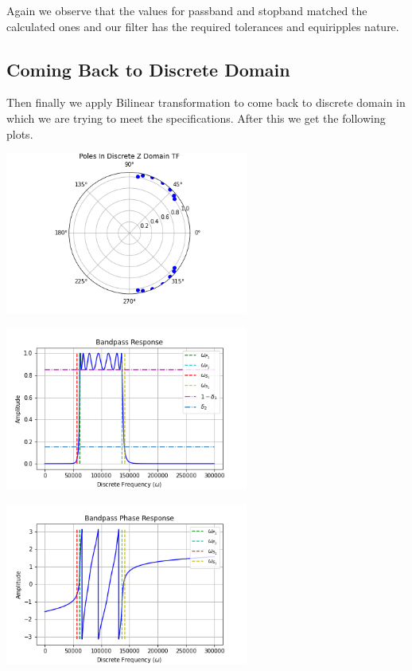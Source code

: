 \documentclass{scrartcl}
\begin{document}
Again we observe that the values for passband and stopband matched the calculated ones and our filter has the required tolerances and equiripples nature.

\subsection{Coming Back to Discrete Domain}

Then finally we apply Bilinear transformation to come back to discrete domain in which we are trying to meet the specifications. After this we get the following plots.


\begin{center}
    \includegraphics[width=0.6\textwidth]{Graphics/Poles_z.png}\par\vspace{0.2cm}
\end{center}

\begin{center}
    \includegraphics[width=0.6\textwidth]{Graphics/Zreal.png}\par\vspace{0.2cm}
\end{center}
\begin{center}
    \includegraphics[width=0.6\textwidth]{Graphics/Zphase.png}\par\vspace{0.2cm}    
\end{center}
\end{document}

